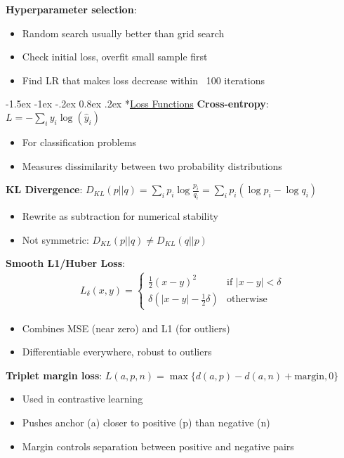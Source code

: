 \documentclass{article}
\makeatletter
\renewcommand\section{\@startsection{section}{1}{\z@}%
                                  {-1.5ex \@plus -1ex \@minus -.2ex}%
                                  {0.8ex \@plus.2ex}%
                                  {\normalfont\small\bfseries}}
\makeatother
\begin{document}
\begin{multicols}{3}
\textbf{Hyperparameter selection}:
\begin{itemize}
\item Random search usually better than grid search
\item Check initial loss, overfit small sample first
\item Find LR that makes loss decrease within ~100 iterations
\end{itemize}

\section*{\underline{Loss Functions}}
\textbf{Cross-entropy}: $L = -\sum_i y_i \log(\hat{y}_i)$
\begin{itemize}
\item For classification problems
\item Measures dissimilarity between two probability distributions
\end{itemize}

\textbf{KL Divergence}: $D_{KL}(p||q) = \sum_i p_i \log\frac{p_i}{q_i} = \sum_i p_i(\log p_i - \log q_i)$
\begin{itemize}
\item Rewrite as subtraction for numerical stability
\item Not symmetric: $D_{KL}(p||q) \neq D_{KL}(q||p)$
\end{itemize}

\textbf{Smooth L1/Huber Loss}:
\begin{align*}
L_{\delta}(x, y) = \begin{cases}
\frac{1}{2}(x-y)^2 & \text{if } |x-y| < \delta \\
\delta(|x-y| - \frac{1}{2}\delta) & \text{otherwise}
\end{cases}
\end{align*}
\begin{itemize}
\item Combines MSE (near zero) and L1 (for outliers)
\item Differentiable everywhere, robust to outliers
\end{itemize}

\textbf{Triplet margin loss}: $L(a,p,n) = \max\{d(a,p) - d(a,n) + \text{margin}, 0\}$
\begin{itemize}
\item Used in contrastive learning
\item Pushes anchor (a) closer to positive (p) than negative (n)
\item Margin controls separation between positive and negative pairs
\end{itemize}


\end{multicols}
\end{document}
